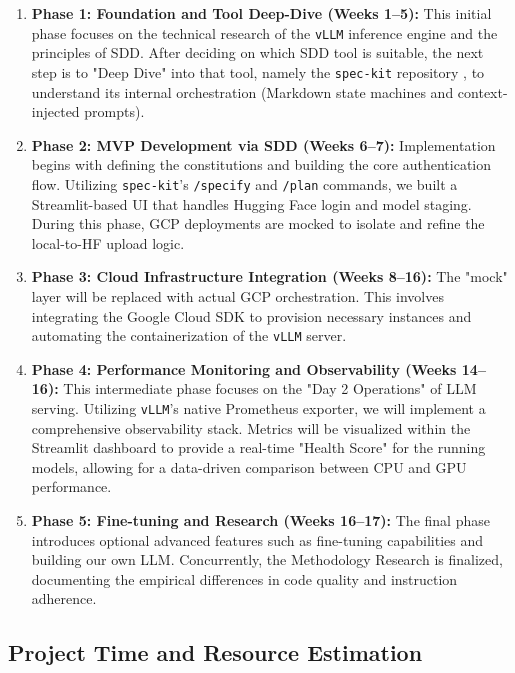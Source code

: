 \documentclass[a4paper,12pt]{report}
\begin{document}
\begin{enumerate}
    \item \textbf{Phase 1: Foundation and Tool Deep-Dive (Weeks 1--5):} This initial phase focuses on the technical research of the \texttt{vLLM} inference engine \cite{vllm_repo, vllm_paper} and the principles of SDD. After deciding on which SDD tool is suitable, the next step is to "Deep Dive" into that tool, namely the \texttt{spec-kit} repository \cite{speckit_repo}, to understand its internal orchestration (Markdown state machines and context-injected prompts).
    
    \item \textbf{Phase 2: MVP Development via SDD (Weeks 6--7):} Implementation begins with defining the constitutions and building the core authentication flow. Utilizing \texttt{spec-kit}'s \texttt{/specify} and \texttt{/plan} commands, we built a Streamlit-based UI that handles Hugging Face login and model staging. During this phase, GCP deployments are mocked to isolate and refine the local-to-HF upload logic.
    
    \item \textbf{Phase 3: Cloud Infrastructure Integration (Weeks 8--16):} The "mock" layer will be replaced with actual GCP orchestration. This involves integrating the Google Cloud SDK to provision necessary instances and automating the containerization of the \texttt{vLLM} server.

    \item \textbf{Phase 4: Performance Monitoring and Observability (Weeks 14--16):}
This intermediate phase focuses on the "Day 2 Operations" of LLM serving. Utilizing \texttt{vLLM}'s native Prometheus exporter, we will implement a comprehensive observability stack. Metrics will be visualized within the Streamlit dashboard to provide a real-time "Health Score" for the running models, allowing for a data-driven comparison between CPU and GPU performance.
    
    \item \textbf{Phase 5: Fine-tuning and Research (Weeks 16--17):} The final phase introduces optional advanced features such as fine-tuning capabilities and building our own LLM. Concurrently, the Methodology Research is finalized, documenting the empirical differences in code quality and instruction adherence.

\end{enumerate}

\subsection{Project Time and Resource Estimation}
\end{document}
